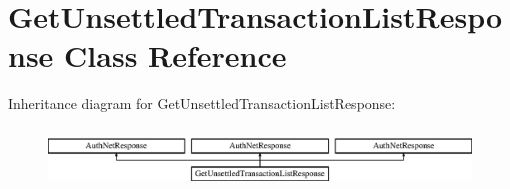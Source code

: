 \hypertarget{interface_get_unsettled_transaction_list_response}{
\section{GetUnsettledTransactionListResponse Class Reference}
\label{interface_get_unsettled_transaction_list_response}
}
Inheritance diagram for GetUnsettledTransactionListResponse:\begin{figure}[H]
\begin{center}
\leavevmode
\includegraphics[height=1.623188cm]{interface_get_unsettled_transaction_list_response}
\end{center}
\end{figure}
